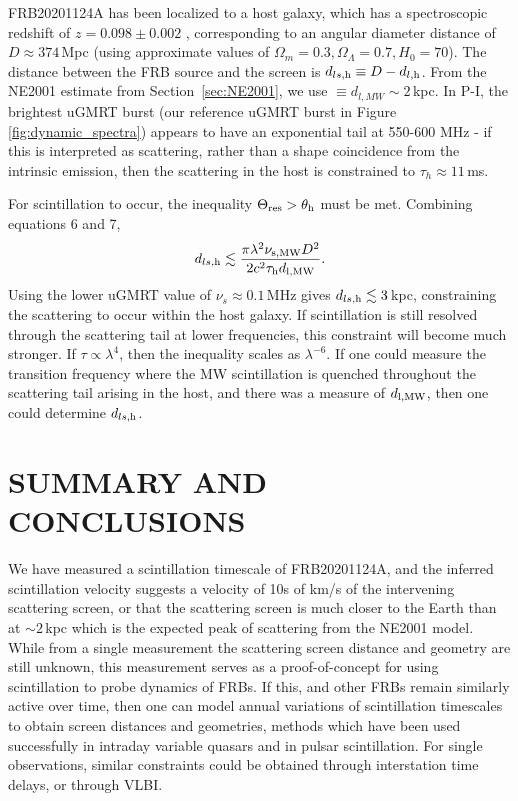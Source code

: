\documentclass[fleqn,usenatbib]{mnras}
\newcommand{\frb}{FRB20201124A}
\begin{document}
{\frb} has been localized to a host galaxy, which has a spectroscopic redshift of $z=0.098\pm0.002$ \citep{redshiftatel, fong+21, ravi+21}, corresponding to an angular diameter distance of $D \approx 374$\,Mpc (using approximate values of $\Omega_{m}=0.3, \Omega_{\Lambda}=0.7, H_{0}=70$).  The distance between the FRB source and the screen is $d_{ls,\rm h} \equiv D - d_{l, \rm h}$.  From the NE2001 estimate from Section~\ref{sec:NE2001}, we use $\equiv d_{l,MW} \sim 2\,$kpc.  In P-I, the brightest uGMRT burst (our reference uGMRT burst in Figure \ref{fig:dynamic_spectra}) appears to have an exponential tail at 550-600 MHz - if this is interpreted as scattering, rather than a shape coincidence from the intrinsic emission, then the scattering in the host is constrained to $\tau_{h} \approx 11\,$ms.

For scintillation to occur, the inequality $\Theta_\mathrm{res} > \theta_{\rm h}$ must be met.  Combining equations 6 and 7,
\begin{equation}
    d_{ls,\rm h} \lesssim \frac{\pi \lambda^{2} \nu_{\rm s, MW} D^{2} }{2 c^{2} \tau_{\rm h} d_{\rm l,MW}}.
\end{equation}
Using the lower uGMRT value of $\nu_{s}\approx 0.1\,$MHz gives $d_{ls,\rm h} \lesssim 3\,$kpc, constraining the scattering to occur within the host galaxy.
If scintillation is still resolved through the scattering tail at lower frequencies, this constraint will become much stronger.  If $\tau \propto \lambda^{4}$, then the inequality scales as 
$\lambda^{-6}$.
If one could measure the transition frequency where the MW scintillation is quenched throughout the scattering tail arising in the host, and there was a measure of $d_{\rm l,MW}$, then one could determine $d_{ls,\rm h}$. 


\section{SUMMARY AND CONCLUSIONS}
\label{sec:conclusion}

We have measured a scintillation timescale of {\frb}, and the inferred scintillation velocity suggests a velocity of 10s of km/s of the intervening scattering screen, or that the scattering screen is much closer to the Earth than at $\sim 2\,$kpc which is the expected peak of scattering from the NE2001 model.  While from a single measurement the scattering screen distance and geometry are still unknown, this measurement serves as a proof-of-concept for using scintillation to probe dynamics of FRBs.  If this, and other FRBs remain similarly active over time, then one can model annual variations of scintillation timescales to obtain screen distances and geometries, methods which have been used successfully in intraday variable quasars and in pulsar scintillation.  For single observations, similar constraints could be obtained through interstation time delays, or through VLBI.
\end{document}
